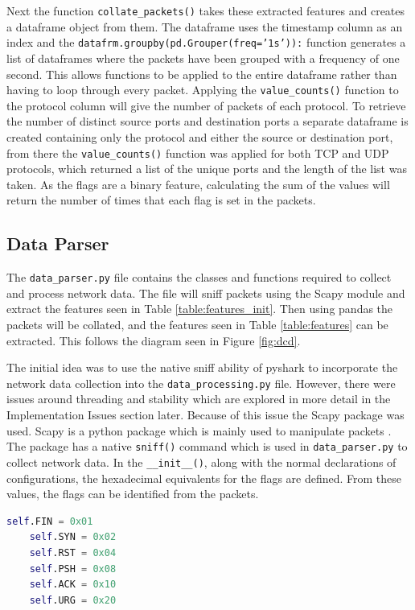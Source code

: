 Next the function \texttt{collate\_packets()} takes these extracted features and creates a dataframe object from them. The dataframe uses the timestamp column as an index and the \texttt{datafrm.groupby(pd.Grouper(freq=’1s’)):} function generates a list of dataframes where the packets have been grouped with a frequency of one second. This allows functions to be applied to the entire dataframe rather than having to loop through every packet. Applying the \texttt{value\_counts()} function to the protocol column will give the number of packets of each protocol. To retrieve the number of distinct source ports and destination ports a separate dataframe is created containing only the protocol and either the source or destination port, from there the \texttt{value\_counts()} function was applied for both TCP and UDP protocols, which returned a list of the unique ports and the length of the list was taken. As the flags are a binary feature, calculating the sum of the values will return the number of times that each flag is set in the packets.  

\subsection{Data Parser}
The \texttt{data\_parser.py} file contains the classes and functions required to collect and process network data. The file will sniff packets using the Scapy module and extract the features seen in Table \ref{table:features_init}. Then using pandas the packets will be collated, and the features seen in Table \ref{table:features} can be extracted. This follows the diagram seen in Figure \ref{fig:dcd}. 

The initial idea was to use the native sniff ability of pyshark to incorporate the network data collection into the \texttt{data\_processing.py} file. However, there were issues around threading and stability which are explored in more detail in the Implementation Issues section later. Because of this issue the Scapy package was used. Scapy is a python package which is mainly used to manipulate packets \cite{scapy}. The package has a native \texttt{sniff()} command which is used in \texttt{data\_parser.py} to collect network data. In the \texttt{\_\_init\_\_()}, along with the normal declarations of configurations, the hexadecimal equivalents for the flags are defined. From these values, the flags can be identified from the packets.

\begin{lstlisting}[language = python]
    self.FIN = 0x01
    self.SYN = 0x02
    self.RST = 0x04
    self.PSH = 0x08
    self.ACK = 0x10
    self.URG = 0x20
\end{lstlisting}

